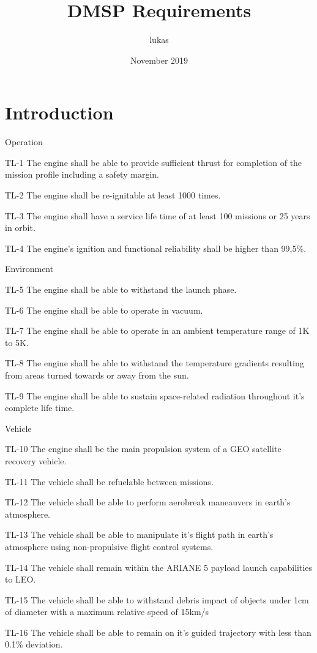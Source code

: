 \documentclass{article}
\title{DMSP Requirements}
\author{lukas }
\date{November 2019}
\begin{document}
\maketitle

\section{Introduction}

Operation

TL-1 The engine shall be able to provide sufficient thrust for completion of the mission profile including a safety margin.

TL-2 The engine shall be re-ignitable at least 1000 times.

TL-3 The engine shall have a service life time of at least 100 missions or 25 years in orbit.

TL-4 The engine's ignition and functional reliability shall be higher than 99,5$\%$.

Environment

TL-5 The engine shall be able to withstand the launch phase.

TL-6 The engine shall be able to operate in vacuum.

TL-7 The engine shall be able to operate in an ambient temperature range of 1K to 5K.

TL-8 The engine shall be able to withstand the temperature gradients resulting from areas turned towards or away from the sun.

TL-9 The engine shall be able to sustain space-related radiation throughout it's complete life time.

Vehicle

TL-10 The engine shall be the main propulsion system of a GEO satellite recovery vehicle.

TL-11 The vehicle shall be refuelable between missions.

TL-12 The vehicle shall be able to perform aerobreak maneauvers in earth's atmosphere.

TL-13 The vehicle shall be able to manipulate it's flight path in earth's atmosphere using non-propulsive flight control systems.

TL-14 The vehicle shall remain within the ARIANE 5 payload launch capabilities to LEO.

TL-15 The vehicle shall be able to withstand debris impact of objects under 1cm of diameter with a maximum relative speed of 15km/s

TL-16 The vehicle shall be able to remain on it's guided trajectory with less than 0.1$\%$ deviation.
\end{document}
